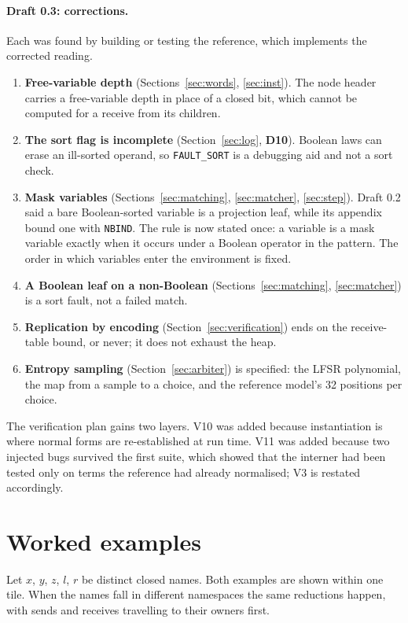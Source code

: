 \documentclass[10.5pt,a4paper]{extarticle}
\newcommand{\kw}[1]{\texttt{#1}}
\newcommand{\dec}[1]{\textbf{D#1}}
\theoremstyle{definition}
\theoremstyle{remark}
\begin{document}
\paragraph{Draft 0.3: corrections.} Each was found by building or testing the reference,
which implements the corrected reading.
\begin{enumerate}
\item \textbf{Free-variable depth} (Sections~\ref{sec:words},
\ref{sec:inst}). The node header carries a free-variable depth in place of a
closed bit, which cannot be computed for a receive from its children.
\item \textbf{The sort flag is incomplete} (Section~\ref{sec:log}, \dec{10}).
Boolean laws can erase an ill-sorted operand, so \kw{FAULT\_SORT} is a
debugging aid and not a sort check.
\item \textbf{Mask variables} (Sections~\ref{sec:matching},
\ref{sec:matcher}, \ref{sec:step}). Draft 0.2 said a bare Boolean-sorted
variable is a projection leaf, while its appendix bound one with \kw{NBIND}.
The rule is now stated once: a variable is a mask variable exactly when it
occurs under a Boolean operator in the pattern. The order in which variables
enter the environment is fixed.
\item \textbf{A Boolean leaf on a non-Boolean} (Sections~\ref{sec:matching},
\ref{sec:matcher}) is a sort fault, not a failed match.
\item \textbf{Replication by encoding} (Section~\ref{sec:verification}) ends
on the receive-table bound, or never; it does not exhaust the heap.
\item \textbf{Entropy sampling} (Section~\ref{sec:arbiter}) is specified: the
LFSR polynomial, the map from a sample to a choice, and the reference
model's 32 positions per choice.
\end{enumerate}
The verification plan gains two layers. V10 was added because instantiation
is where normal forms are re-established at run time. V11 was added because
two injected bugs survived the first suite, which showed that the interner
had been tested only on terms the reference had already normalised; V3 is
restated accordingly.

\appendix
\section{Worked examples}\label{sec:examples}

Let $x$, $y$, $z$, $l$, $r$ be distinct closed names. Both examples are
shown within one tile. When the names fall in different namespaces the same
reductions happen, with sends and receives travelling to their owners first.
\end{document}
